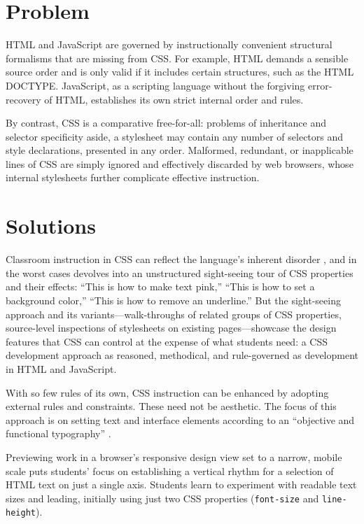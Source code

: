 \documentclass[sigconf]{acmart}
\begin{document}
\section{Problem}
HTML and JavaScript are governed by instructionally convenient structural formalisms that are missing from CSS. For example, HTML demands a sensible source order and is only valid if it includes certain structures, such as the HTML DOCTYPE. JavaScript, as a scripting language without the forgiving error-recovery of HTML, establishes its own strict internal order and rules.

By contrast, CSS is a comparative free-for-all: problems of inheritance and selector specificity aside, a stylesheet may contain any number of selectors and style declarations, presented in any order. Malformed, redundant, or inapplicable lines of CSS are simply ignored and effectively discarded by web browsers, whose internal stylesheets further complicate effective instruction.

\section{Solutions}
Classroom instruction in CSS can reflect the language's inherent disorder \cite{pw:learning}, and in the worst cases devolves into an unstructured sight-seeing tour of CSS properties and their effects: “This is how to make text pink,” “This is how to set a background color,” “This is how to remove an underline.” But the sight-seeing approach and its variants—walk-throughs of related groups of CSS properties, source-level inspections of stylesheets on existing pages—showcase the design features that CSS can control at the expense of what students need: a CSS development approach as reasoned, methodical, and rule-governed as development in HTML and JavaScript.

With so few rules of its own, CSS instruction can be enhanced by adopting external rules and constraints. These need not be aesthetic. The focus of this approach is on setting text and interface elements according to an “objective and functional typography” \cite{mb:grid}.

Previewing work in a browser's responsive design view set to a narrow, mobile scale puts students' focus on establishing a vertical rhythm for a selection of HTML text on just a single axis. Students learn to experiment with readable text sizes and leading, initially using just two CSS properties (\verb|font-size| and \verb|line-height|).
\end{document}

